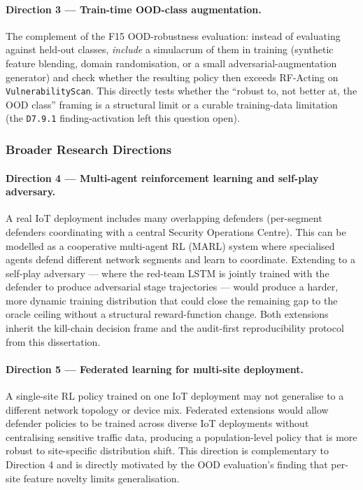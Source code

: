 \paragraph{Direction 3 --- Train-time OOD-class augmentation.} The complement of the F15 OOD-robustness evaluation: instead of evaluating against held-out classes, \emph{include} a simulacrum of them in training (synthetic feature blending, domain randomisation, or a small adversarial-augmentation generator) and check whether the resulting policy then exceeds RF-Acting on \texttt{VulnerabilityScan}. This directly tests whether the ``robust to, not better at, the OOD class'' framing is a structural limit or a curable training-data limitation (the \texttt{D7.9.1} finding-activation left this question open).

\subsubsection{Broader Research Directions}

\paragraph{Direction 4 --- Multi-agent reinforcement learning and self-play adversary.} A real IoT deployment includes many overlapping defenders (per-segment defenders coordinating with a central Security Operations Centre). This can be modelled as a cooperative multi-agent RL (MARL) system where specialised agents defend different network segments and learn to coordinate. Extending to a self-play adversary --- where the red-team LSTM is jointly trained with the defender to produce adversarial stage trajectories --- would produce a harder, more dynamic training distribution that could close the remaining gap to the oracle ceiling without a structural reward-function change. Both extensions inherit the kill-chain decision frame and the audit-first reproducibility protocol from this dissertation.

\paragraph{Direction 5 --- Federated learning for multi-site deployment.} A single-site RL policy trained on one IoT deployment may not generalise to a different network topology or device mix. Federated extensions would allow defender policies to be trained across diverse IoT deployments without centralising sensitive traffic data, producing a population-level policy that is more robust to site-specific distribution shift. This direction is complementary to Direction 4 and is directly motivated by the OOD evaluation's finding that per-site feature novelty limits generalisation.

